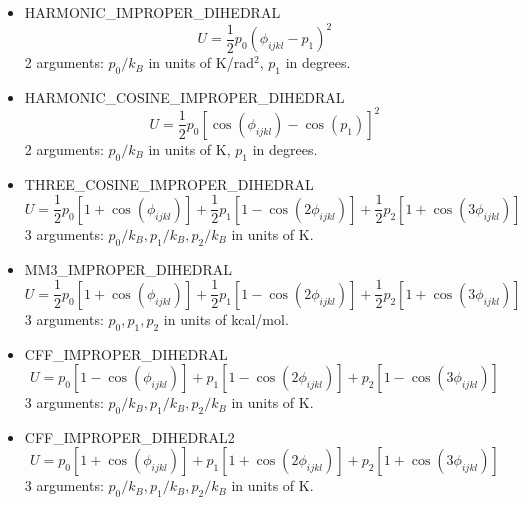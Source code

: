 \begin{itemize}
  \item{HARMONIC\_IMPROPER\_DIHEDRAL}\\
  \begin{equation}
  U=\frac{1}{2}p_0\left(\phi_{ijkl}-p_1\right)^2
  \end{equation}
  2 arguments: $p_0/k_B$ in units of K/rad$^2$, $p_1$ in degrees.

  \item{HARMONIC\_COSINE\_IMPROPER\_DIHEDRAL}\\
  \begin{equation}
  U=\frac{1}{2}p_0\left[\cos\left(\phi_{ijkl}\right)-\cos\left(p_1\right)\right]^2
  \end{equation}
  2 arguments: $p_0/k_B$ in units of K, $p_1$ in degrees.

  \item{THREE\_COSINE\_IMPROPER\_DIHEDRAL}\\
  \begin{equation}
  U=\frac{1}{2}p_0\left[1+\cos\left(\phi_{ijkl}\right)\right]+
    \frac{1}{2}p_1\left[1-\cos\left(2\phi_{ijkl}\right)\right]+
    \frac{1}{2}p_2\left[1+\cos\left(3\phi_{ijkl}\right)\right]
  \end{equation}
  3 arguments: $p_0/k_B,p_1/k_B,p_2/k_B$ in units of K.

  \item{MM3\_IMPROPER\_DIHEDRAL}\\
  \begin{equation}
  U=\frac{1}{2}p_0\left[1+\cos\left(\phi_{ijkl}\right)\right]+
    \frac{1}{2}p_1\left[1-\cos\left(2\phi_{ijkl}\right)\right]+
    \frac{1}{2}p_2\left[1+\cos\left(3\phi_{ijkl}\right)\right]
  \end{equation}
  3 arguments: $p_0,p_1,p_2$ in units of kcal/mol.


  \item{CFF\_IMPROPER\_DIHEDRAL}\\
  \begin{equation}
  U=p_0\left[1-\cos\left(\phi_{ijkl}\right)\right]+
    p_1\left[1-\cos\left(2\phi_{ijkl}\right)\right]+
    p_2\left[1-\cos\left(3\phi_{ijkl}\right)\right]
  \end{equation}
  3 arguments: $p_0/k_B,p_1/k_B,p_2/k_B$ in units of K.

  \item{CFF\_IMPROPER\_DIHEDRAL2}\\
  \begin{equation}
  U=p_0\left[1+\cos\left(\phi_{ijkl}\right)\right]+
    p_1\left[1+\cos\left(2\phi_{ijkl}\right)\right]+
    p_2\left[1+\cos\left(3\phi_{ijkl}\right)\right]
  \end{equation}
  3 arguments: $p_0/k_B,p_1/k_B,p_2/k_B$ in units of K.


\end{itemize}

